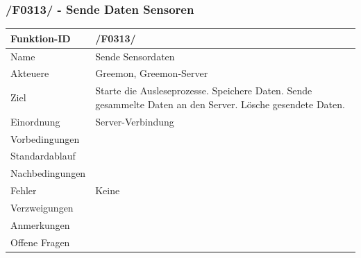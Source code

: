 \documentclass[pointlessnumbers]{scrartcl}
\begin{document}
 \subsubsection{/F0313/ - Sende Daten Sensoren}
 \begin{tabular}{|p{\BreiteErsterTab}|p{\BreiteZweiterTab}|}\hline
   Funktion-ID          & /F0313/  
                        \\ \hline
   Name                 & Sende Sensordaten
                        \\ \hline
   Akteuere             & Greemon, Greemon-Server
                        \\ \hline
   Ziel                 & Starte die Ausleseprozesse. 
                            Speichere Daten. 
                            Sende gesammelte Daten an den Server. 
                            Lösche gesendete Daten. 
                        \\ \hline
    Einordnung          &  Server-Verbindung 
                        \\ \hline
    Vorbedingungen      &  
                        \\ \hline
    Standardablauf      & 
                        \\ \hline
    Nachbedingungen     &  
                        \\ \hline
    Fehler              & Keine 
                        \\ \hline
    Verzweigungen       &  
                        \\ \hline
    Anmerkungen         &  
                        \\ \hline
    Offene Fragen       & 
                        \\ \hline
 \end{tabular} 


%
\end{document}
